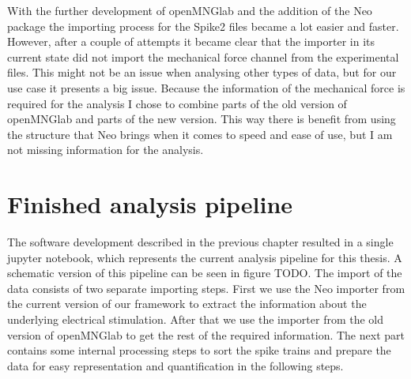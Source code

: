 With the further development of openMNGlab and the addition of the Neo package the importing process for the Spike2 files became a lot easier and faster. However, after a couple of attempts it became clear that the importer in its current state did not import the mechanical force channel from the experimental files. This might not be an issue when analysing other types of data, but for our use case it presents a big issue. Because the information of the mechanical force is required for the analysis I chose to combine parts of the old version of openMNGlab and parts of the new version. This way there is benefit from using the structure that Neo brings when it comes to speed and ease of use, but I am not missing information for the analysis.


\section{Finished analysis pipeline}
The software development described in the previous chapter resulted in a single jupyter notebook, which represents the current analysis pipeline for this thesis. A schematic version of this pipeline can be seen in figure TODO. The import of the data consists of two separate importing steps. First we use the Neo importer from the current version of our framework to extract the information about the underlying electrical stimulation. After that we use the importer from the old version of openMNGlab to get the rest of the required information. The next part contains some internal processing steps to sort the spike trains and prepare the data for easy representation and quantification in the following steps.

